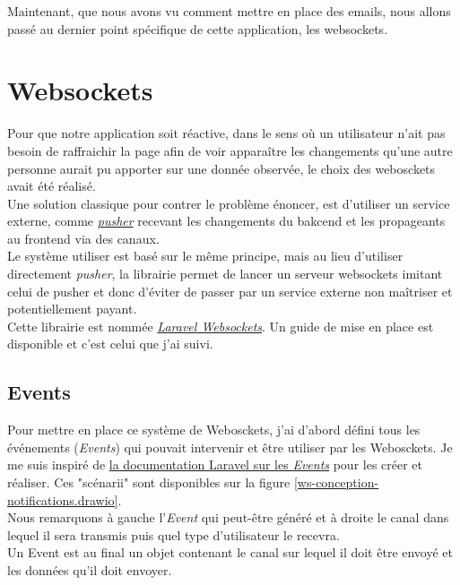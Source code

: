 \documentclass[
    iai, %
    il, %
]{heig-tb}
\begin{document}
Maintenant, que nous avons vu comment mettre en place des emails, nous allons passé au dernier point spécifique de cette application, les \Gls{websockets}.

\section{Websockets}
Pour que notre application soit réactive, dans le sens où un utilisateur n'ait pas besoin de raffraichir la page afin de voir apparaître les changements qu'une autre personne aurait pu apporter sur une donnée observée, le choix des webosckets avait été réalisé. \\
Une solution classique pour contrer le problème énoncer, est d'utiliser un service externe, comme \href{https://pusher.com/}{\emph{pusher}} recevant les changements du bakcend et les propageants au \Gls{frontend} via des canaux. \\
Le système utiliser est basé sur le même principe, mais au lieu d'utiliser directement \emph{pusher}, la librairie permet de lancer un serveur \Gls{websockets} imitant celui de pusher et donc d'éviter de passer par un service externe non maîtriser et potentiellement payant. \\
Cette librairie est nommée \href{https://beyondco.de/docs/laravel-websockets/getting-started/introduction}{\emph{Laravel Websockets}}. Un guide de mise en place est disponible et c'est celui que j'ai suivi.

\subsection{Events}

Pour mettre en place ce système de Webosckets, j'ai d'abord défini tous les événements (\emph{Events}) qui pouvait intervenir et être utiliser par les Webosckets. Je me suis inspiré de \href{https://laravel.com/docs/9.x/events}{la documentation Laravel sur les \emph{Events}} pour les créer et réaliser.
Ces "scénarii" sont disponibles sur la figure \ref{ws-conception-notifications.drawio}. \\
Nous remarquons à gauche l'\emph{Event} qui peut-être généré et à droite le canal dans lequel il sera transmis puis quel type d'utilisateur le recevra. \\
Un Event est au final un objet contenant le canal sur lequel il doit être envoyé et les données qu'il doit envoyer.
\end{document}
